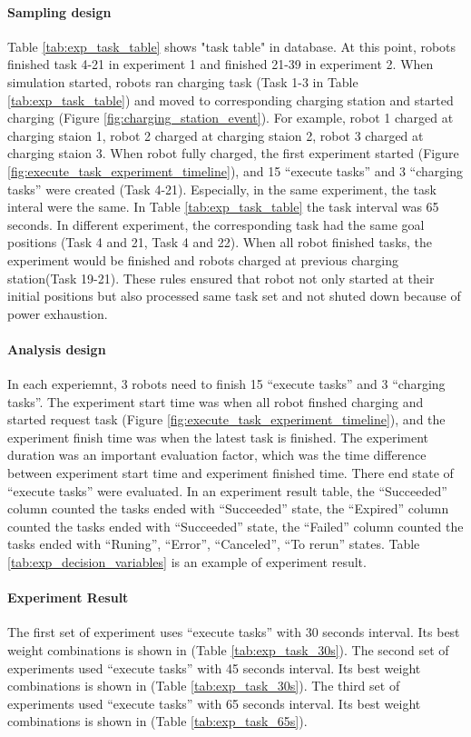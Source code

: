 \paragraph{Sampling design}
Table \ref{tab:exp_task_table} shows "task table" in database. At this point, robots finished task 4-21 in experiment 1 and finished 21-39 in experiment 2. When simulation started, robots ran charging task (Task 1-3 in Table \ref{tab:exp_task_table}) and moved to corresponding charging station and started charging (Figure \ref{fig:charging_station_event}). For example, robot 1 charged at charging staion 1, robot 2 charged at charging staion 2, robot 3 charged at charging staion 3. 
    When robot fully charged, the first experiment started (Figure \ref{fig:execute_task_experiment_timeline}), and 15 ``execute tasks'' and 3 ``charging tasks'' were created (Task 4-21). Especially, in the same experiment, the task interal were the same. In Table \ref{tab:exp_task_table} the task interval was 65 seconds. In different experiment, the corresponding task had the same goal positions (Task 4 and 21, Task 4 and 22). 
    When all robot finished tasks, the experiment would be finished and robots charged at previous charging station(Task 19-21).
    These rules ensured that robot not only started at their initial positions but also processed same task set and not shuted down because of power exhaustion.


\paragraph{Analysis design}
In each experiemnt, 3 robots need to finish 15 ``execute tasks'' and 3 ``charging tasks''.
The experiment start time was when all robot finshed charging and started request task (Figure \ref{fig:execute_task_experiment_timeline}), and the experiment finish time was when the latest task is finished.
The experiment duration was an important evaluation factor, which was the time difference between experiment start time and experiment finished time.  
There end state of ``execute tasks'' were evaluated. In an experiment result table, the ``Succeeded'' column counted the tasks ended with ``Succeeded'' state, the ``Expired'' column counted the tasks ended with ``Succeeded'' state, the ``Failed'' column counted the tasks ended with ``Runing'', ``Error'', ``Canceled'', ``To rerun'' states. 
Table \ref{tab:exp_decision_variables} is an example of experiment result. 

\paragraph{Experiment Result} 
The first set of experiment uses ``execute tasks'' with 30 seconds interval. Its best weight combinations is shown in (Table \ref{tab:exp_task_30s}).
The second set of experiments used ``execute tasks'' with 45 seconds interval. Its best weight combinations is shown in (Table \ref{tab:exp_task_30s}).
The third set of experiments used ``execute tasks'' with 65 seconds interval. Its best weight combinations is shown in (Table \ref{tab:exp_task_65s}).    
